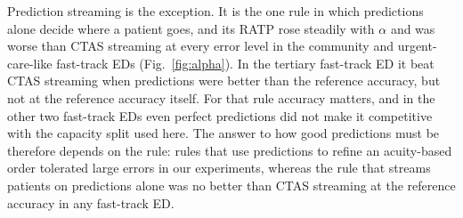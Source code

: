 Prediction streaming is the exception. It is the one rule in which predictions alone decide where a patient goes, and its RATP rose steadily with $\alpha$ and was worse than CTAS streaming at every error level in the community and urgent-care-like fast-track EDs (Fig.~\ref{fig:alpha}). In the tertiary fast-track ED it beat CTAS streaming when predictions were better than the reference accuracy, but not at the reference accuracy itself. For that rule accuracy matters, and in the other two fast-track EDs even perfect predictions did not make it competitive with the capacity split used here. The answer to how good predictions must be therefore depends on the rule: rules that use predictions to refine an acuity-based order tolerated large errors in our experiments, whereas the rule that streams patients on predictions alone was no better than CTAS streaming at the reference accuracy in any fast-track ED.


